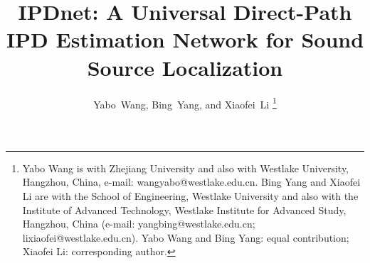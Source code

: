 \documentclass[lettersize,journal]{IEEEtran}
\begin{document}
\title{IPDnet: A Universal Direct-Path IPD Estimation Network for Sound Source Localization }

\author{Yabo~Wang, Bing~Yang, and Xiaofei~Li
\thanks{Yabo Wang is with Zhejiang University and also with Westlake University, Hangzhou, China, e-mail: wangyabo@westlake.edu.cn.
Bing Yang and Xiaofei Li are with the School of Engineering, Westlake
University and also with the Institute of Advanced Technology, Westlake Institute for Advanced Study, Hangzhou, China
(e-mail: yangbing@westlake.edu.cn; lixiaofei@westlake.edu.cn). Yabo Wang and Bing Yang: equal contribution; Xiaofei Li: corresponding author.}
}



\maketitle
\end{document}
